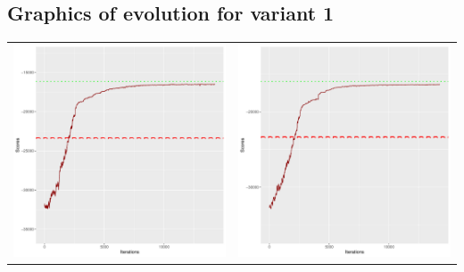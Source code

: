 \documentclass[]{scrartcl}
\begin{document}
\newpage

\subsection{Graphics of evolution for variant 1}

\begin{table}[h!]
\begin{tabular}{cc}
\includegraphics[scale = 0.4]{./figs/win95pts/v1/25/boundsEvolution-14252.pdf} & 
\includegraphics[scale = 0.4]{./figs/win95pts/v1/50/boundsEvolution-14252.pdf} \\

\end{tabular}
\end{table}
\end{document}
